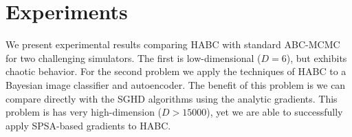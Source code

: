\documentclass[]{article}
\begin{document}


\section{Experiments}\label{sec:experiments}
We present experimental results comparing HABC with standard ABC-MCMC for two challenging simulators.  The first is low-dimensional ($D=6$), but exhibits chaotic behavior.  For the second problem we apply the techniques of HABC to a Bayesian image classifier and autoencoder.  The benefit of this problem is we can compare directly with the SGHD algorithms using the analytic gradients.  This problem is has very high-dimension ($D>15000$), yet we are able to successfully apply SPSA-based gradients to HABC. 
\end{document}
